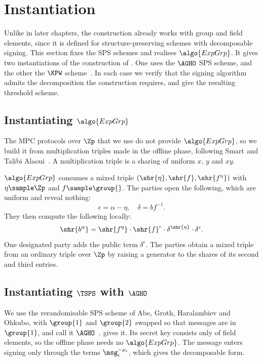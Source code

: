 \section{Instantiation}\label{sec:tsps-instantiation}

Unlike in later chapters, the construction already works with group and field
elements, since it is defined for structure-preserving schemes with
decomposable signing. This section fixes the SPS schemes and realises $\algo{ExpGrp}$. It
gives two instantiations of the construction of .
One uses the $\AGHO$ SPS scheme, and the other the $\KPW$
scheme~\cite{C:AGHO11,C:KilPanWee15}. In each case we verify that
the signing algorithm admits the decomposition the construction requires, and
give the resulting threshold scheme.

\subsection{Instantiating $\algo{ExpGrp}$}\label{sec:tsps-mpc-inst}

The MPC protocols over $\Zp$ that we use do not provide $\algo{ExpGrp}$, so we build it from
multiplication triples made in the offline phase, following Smart and Talibi
Alaoui~\cite{C:Beaver91b,IMA:SmaTal19}. A multiplication triple is a sharing of
uniform $x$, $y$ and $xy$.

$\algo{ExpGrp}$ consumes a mixed triple $(\shr{\eta}, \shr{f}, \shr{f^\eta})$
with $\eta \sample \Zp$ and $f \sample \group{}$. The parties open the
following, which are uniform and reveal nothing:
%
\begin{equation*}
%
  \epsilon = \alpha - \eta, \quad \delta = b f^{-1}.
%
\end{equation*}
%
They then compute the following locally:
%
\begin{equation*}
%
  \shr{b^{\alpha}} = \shr{f^{\eta}} \cdot \shr{f}^{\epsilon} \cdot
\delta^{\shr{\eta}} \cdot \delta^{\epsilon}.
%
\end{equation*}
%
One designated party adds the public term $\delta^{\epsilon}$. The
parties obtain a mixed triple from an ordinary triple over $\Zp$ by raising a
generator to the shares of its second and third entries.

\subsection{Instantiating $\TSPS$ with $\AGHO$}\label{sec:tsps-abe}

We use the rerandomisable SPS scheme of Abe, Groth, Haralambiev and Ohkubo,
with $\group{1}$ and $\group{2}$ swapped so that messages are in $\group{1}$,
and call it $\AGHO$~\cite{C:AGHO11}.  gives it. Its secret key
consists only of field elements, so the offline phase needs no $\algo{ExpGrp}$.
The message enters signing only through the terms $\msg_i^{-\mu_i}$, which gives
the decomposable form.

